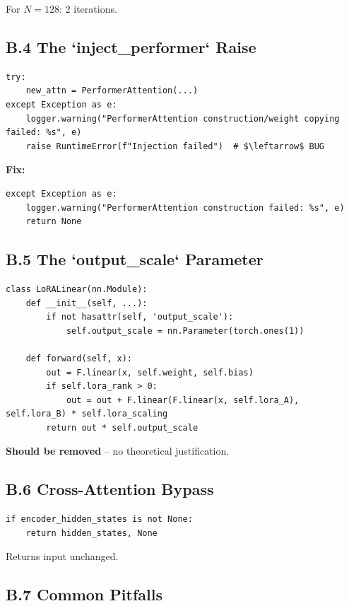 For $N = 128$: 2 iterations.

\subsection{B.4 The `inject\_performer` Raise}

\begin{lstlisting}
try:
    new_attn = PerformerAttention(...)
except Exception as e:
    logger.warning("PerformerAttention construction/weight copying failed: %s", e)
    raise RuntimeError(f"Injection failed")  # $\leftarrow$ BUG
\end{lstlisting}

\textbf{Fix:}

\begin{lstlisting}
except Exception as e:
    logger.warning("PerformerAttention construction failed: %s", e)
    return None
\end{lstlisting}

\subsection{B.5 The `output\_scale` Parameter}

\begin{lstlisting}
class LoRALinear(nn.Module):
    def __init__(self, ...):
        if not hasattr(self, 'output_scale'):
            self.output_scale = nn.Parameter(torch.ones(1))
    
    def forward(self, x):
        out = F.linear(x, self.weight, self.bias)
        if self.lora_rank > 0:
            out = out + F.linear(F.linear(x, self.lora_A), self.lora_B) * self.lora_scaling
        return out * self.output_scale
\end{lstlisting}

\textbf{Should be removed} -- no theoretical justification.

\subsection{B.6 Cross-Attention Bypass}

\begin{lstlisting}
if encoder_hidden_states is not None:
    return hidden_states, None
\end{lstlisting}

Returns input unchanged.

\subsection{B.7 Common Pitfalls}

